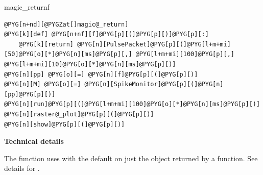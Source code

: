 \documentclass[letterpaper,10pt,english]{manual}
\begin{document}
\begin{funcdesc}{magic\_return}{f}
\begin{Verbatim}[commandchars=@\[\]]
@PYG[n+nd][@PYGZat[]magic@_return]
@PYG[k][def] @PYG[n+nf][f]@PYG[p][(]@PYG[p][)]@PYG[p][:]
    @PYG[k][return] @PYG[n][PulsePacket]@PYG[p][(]@PYG[l+m+mi][50]@PYG[o][*]@PYG[n][ms]@PYG[p][,] @PYG[l+m+mi][100]@PYG[p][,] @PYG[l+m+mi][10]@PYG[o][*]@PYG[n][ms]@PYG[p][)]
@PYG[n][pp] @PYG[o][=] @PYG[n][f]@PYG[p][(]@PYG[p][)]
@PYG[n][M] @PYG[o][=] @PYG[n][SpikeMonitor]@PYG[p][(]@PYG[n][pp]@PYG[p][)]
@PYG[n][run]@PYG[p][(]@PYG[l+m+mi][100]@PYG[o][*]@PYG[n][ms]@PYG[p][)]
@PYG[n][raster@_plot]@PYG[p][(]@PYG[p][)]
@PYG[n][show]@PYG[p][(]@PYG[p][)]
\end{Verbatim}

\textbf{Technical details}

The \hyperlink{brian.magic_return}{} function uses \hyperlink{brian.magic_register}{} with the default 
on just the object returned by a function. See details for \hyperlink{brian.magic_register}{}.
\end{funcdesc}
\end{document}
